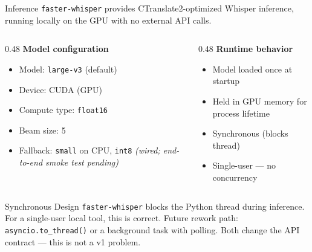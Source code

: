 \documentclass{beamer}
\begin{document}
\begin{frame}{Inference}
    \small
    \texttt{faster-whisper} provides CTranslate2-optimized Whisper inference,
    running locally on the GPU with no external API calls.

    \vspace{0.3em}
    \begin{columns}[T]
        \begin{column}{0.48\textwidth}
            \textbf{Model configuration}
            \begin{itemize}\setlength{\itemsep}{0pt}
                \item Model: \texttt{large-v3} (default)
                \item Device: CUDA (GPU)
                \item Compute type: \texttt{float16}
                \item Beam size: 5
                \item Fallback: \texttt{small} on CPU, \texttt{int8}
                      {\scriptsize\textit{(wired; end-to-end smoke test pending)}}
            \end{itemize}
        \end{column}
        \begin{column}{0.48\textwidth}
            \textbf{Runtime behavior}
            \begin{itemize}\setlength{\itemsep}{0pt}
                \item Model loaded once at startup
                \item Held in GPU memory for process lifetime
                \item Synchronous (blocks thread)
                \item Single-user --- no concurrency
            \end{itemize}
        \end{column}
    \end{columns}

    \vspace{0.3em}
    \begin{block}{Synchronous Design}
        \texttt{faster-whisper} blocks the Python thread during inference.
        For a single-user local tool, this is correct. Future rework path:
        \texttt{asyncio.to\_thread()} or a background task with polling.
        Both change the API contract --- this is not a v1 problem.
    \end{block}
\end{frame}
\end{document}
